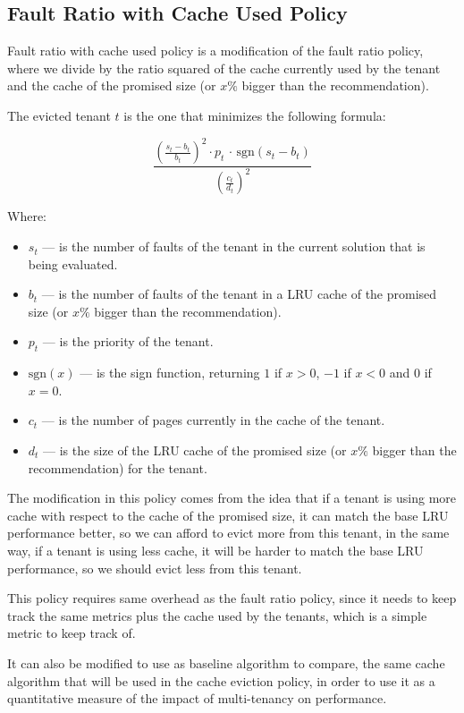 \subsection{Fault Ratio with Cache Used Policy}

Fault ratio with cache used policy is a modification of the fault ratio policy, where we
divide by the ratio squared of the cache currently used by the tenant and the cache of the
promised size (or $x\%$ bigger than the recommendation).

The evicted tenant $t$ is the one that minimizes the following formula:

$$
\frac{ \left( \frac{s_t - b_t}{b_t} \right) ^2 \cdot p_t \, \cdot \, \text{sgn}( s_t - b_t ) }{ \left( \frac{c_t}{d_t} \right) ^2 }
$$

Where:

\begin{itemize}
    \item $s_t$ --- is the number of faults of the tenant in the current solution that is being evaluated.
    \item $b_t$ --- is the number of faults of the tenant in a LRU cache of the promised size (or $x\%$ bigger than the recommendation).
    \item $p_t$ --- is the priority of the tenant.
    \item $\text{sgn}(x)$ --- is the sign function, returning $1$ if $x > 0$, $-1$ if $x < 0$ and $0$ if $x = 0$.
    \item $c_t$ --- is the number of pages currently in the cache of the tenant.
    \item $d_t$ --- is the size of the LRU cache of the promised size (or $x\%$ bigger than the recommendation) for the tenant.
\end{itemize}

The modification in this policy comes from the idea that if a tenant is using more cache
with respect to the cache of the promised size, it can match the base LRU performance 
better, so we can afford to evict more from this tenant, in the same way, if a tenant is
using less cache, it will be harder to match the base LRU performance, so we should evict
less from this tenant.

This policy requires same overhead as the fault ratio policy, since it needs to keep track
the same metrics plus the cache used by the tenants, which is a simple metric to keep track
of.

It can also be modified to use as baseline algorithm to compare, the same cache algorithm
that will be used in the cache eviction policy, in order to use it as a quantitative measure
of the impact of multi-tenancy on performance.

